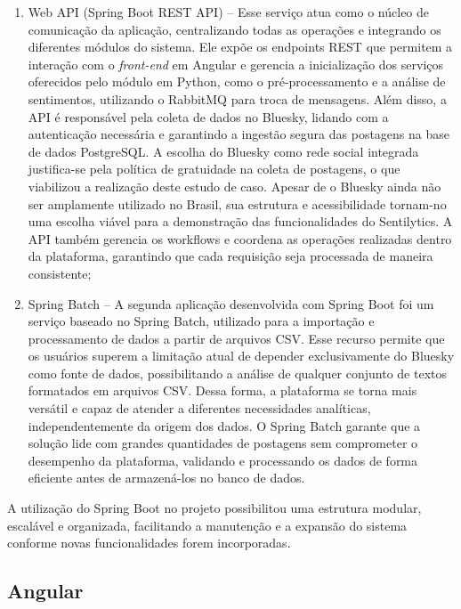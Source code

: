 \documentclass[
	12pt,				%
	oneside,			%
	a4paper,			%
	english,			%
	french,				%
	spanish,			%
	brazil				%
	]{abntex2}
\begin{document}
\begin{enumerate}
\def\labelenumi{\arabic{enumi})}
\item
  Web API (Spring Boot REST API) -- Esse serviço atua como o núcleo de
  comunicação da aplicação, centralizando todas as operações e
  integrando os diferentes módulos do sistema. Ele expõe os endpoints
  REST que permitem a interação com o \emph{front-end} em Angular e
  gerencia a inicialização dos serviços oferecidos pelo módulo em
  Python, como o pré-processamento e a análise de sentimentos,
  utilizando o RabbitMQ para troca de mensagens. Além disso, a API é
  responsável pela coleta de dados no Bluesky, lidando com a
  autenticação necessária e garantindo a ingestão segura das postagens
  na base de dados PostgreSQL. A escolha do Bluesky como rede social
  integrada justifica-se pela política de gratuidade na coleta de
  postagens, o que viabilizou a realização deste estudo de caso. Apesar
  de o Bluesky ainda não ser amplamente utilizado no Brasil, sua
  estrutura e acessibilidade tornam-no uma escolha viável para a
  demonstração das funcionalidades do Sentilytics. A API também gerencia
  os workflows e coordena as operações realizadas dentro da plataforma,
  garantindo que cada requisição seja processada de maneira consistente;
\item
  Spring Batch -- A segunda aplicação desenvolvida com Spring Boot foi
  um serviço baseado no Spring Batch, utilizado para a importação e
  processamento de dados a partir de arquivos CSV. Esse recurso permite
  que os usuários superem a limitação atual de depender exclusivamente
  do Bluesky como fonte de dados, possibilitando a análise de qualquer
  conjunto de textos formatados em arquivos CSV. Dessa forma, a
  plataforma se torna mais versátil e capaz de atender a diferentes
  necessidades analíticas, independentemente da origem dos dados. O
  Spring Batch garante que a solução lide com grandes quantidades de
  postagens sem comprometer o desempenho da plataforma, validando e
  processando os dados de forma eficiente antes de armazená-los no banco
  de dados.
\end{enumerate}

A utilização do Spring Boot no projeto possibilitou uma estrutura
modular, escalável e organizada, facilitando a manutenção e a expansão
do sistema conforme novas funcionalidades forem incorporadas.

\hypertarget{angular}{%
\subsection{Angular}\label{angular}}
\end{document}
